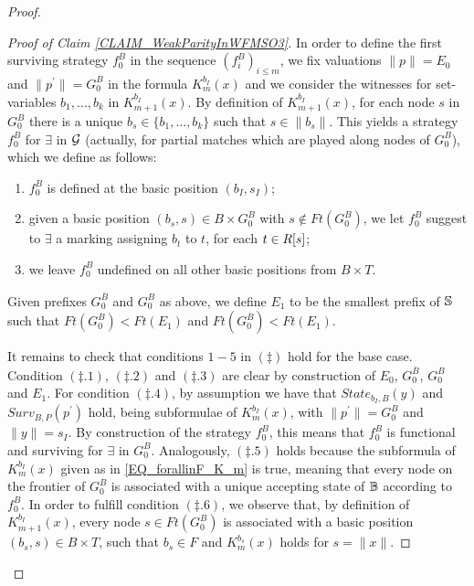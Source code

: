 \begin{proof}
\begin{Iff-LR}
\begin{proof}[Proof of Claim \ref{CLAIM_WeakParityInWFMSO3}]
In order to define the first surviving strategy $f^{B}_0$ in the sequence $(f^{B}_i)_{i\leq m}$, we fix valuations $\|p\|=E_0$ and $\|p^{\prime}\| = G^{B}_0$ in the formula $K_m^{b_I}(x)$ and we consider the witnesses for set-variables $b_1,\dots,b_k$ in $K_{m+1}^{b_I}(x)$. By definition of $K_{m+1}^{b_I}(x)$, for each node $s$ in $G^{B}_0$ there is a unique $b_s \in \{b_1,\dots,b_k\}$ such that $s \in \|b_s\|$. This yields a strategy $f^{B}_0$ for $\exists$ in $\mathcal{G}$ (actually, for partial matches which are played along nodes of $G^{B}_0$), which we define as follows:
 \begin{enumerate}
   \item $f^{B}_0$ is defined at the basic position $(b_I,s_I)$;
   \item given a basic position $(b_s,s) \in B \times G^{B}_0$ with $s \not\in \mathit{Ft}(G^{B}_0)$, we let $f^{B}_0$ suggest to $\exists$ a marking assigning $b_t$ to $t$, for each $t \in R[s]$;
   \item we leave $f^{B}_0$ undefined on all other basic positions from $B \times T$.
 \end{enumerate}

Given prefixes $G_0^{\overline{B}}$ and $G_0^B$ as above, we define $E_1$ to be the smallest prefix of $\mathbb{S}$ such that $\mathit{Ft}(G_0^B) < \mathit{Ft}(E_1)$ and $\mathit{Ft}(G_0^{\overline{B}}) < \mathit{Ft}(E_1)$.

\smallskip

It remains to check that conditions $1-5$ in $(\ddag)$ hold for the base case. Condition $(\ddag .1)$, $(\ddag .2)$ and $(\ddag .3)$ are clear by construction of $E_0$, $G_0^{\overline{B}}$, $G_0^B$ and $E_1$. For condition $(\ddag .4)$, by assumption we have that $\mathit{State}_{b_I,B}(y)$ and $\mathit{Surv}_{B,P}(p^{\prime})$ hold, being subformulae of $K_m^{b_I}(x)$, with $\|p^{\prime}\| = G^{B}_0$ and $\|y\| = s_I$. By construction of the strategy $f^{B}_0$, this means that $f^{B}_0$ is functional and surviving for $\exists$ in $G^{B}_0$. Analogously, $(\ddag .5)$ holds because the subformula of $K_m^{b_I}(x)$ given as in \eqref{EQ_forallinF_K_m} is true, meaning that every node on the frontier of $G^{B}_0$ is associated with a unique accepting state of $\mathbb{B}$ according to $f^{B}_0$. In order to fulfill condition $(\ddag .6)$, we observe that, by definition of $K_{m+1}^{b_I}(x)$, every node $s \in \mathit{Ft}(G^{B}_0)$ is associated with a basic position $(b_s,s) \in B \times T$, such that $b_s \in F$ and $K_{m}^{b_s}(x)$ holds for $s = \|x\|$.



\end{proof}
\end{Iff-LR}
\end{proof}
